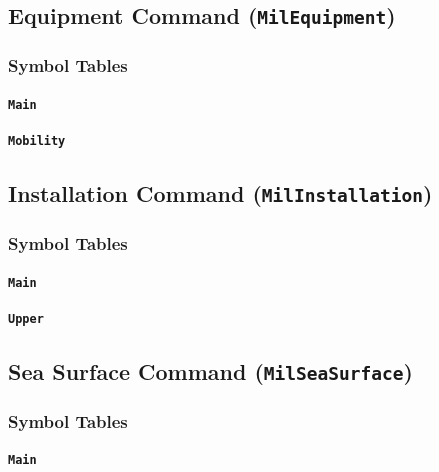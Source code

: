 \documentclass[a4paper, titlepage]{article}
\begin{document}
\subsection{Equipment Command (\textbf{\texttt{MilEquipment}})}

\subsubsection{Symbol Tables}

\paragraph{\texttt{Main}}

\paragraph{\texttt{Mobility}}

\subsection{Installation Command (\textbf{\texttt{MilInstallation}})}

\subsubsection{Symbol Tables}

\paragraph{\texttt{Main}}

\paragraph{\texttt{Upper}}

\subsection{Sea Surface Command (\textbf{\texttt{MilSeaSurface}})}

\subsubsection{Symbol Tables}

\paragraph{\texttt{Main}}
\end{document}
